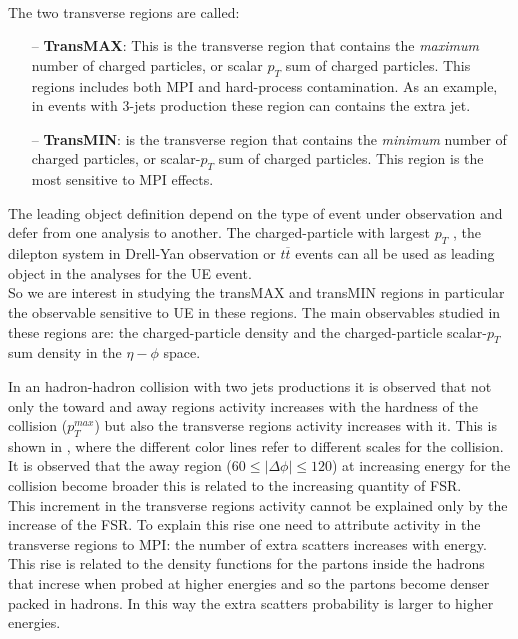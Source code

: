 \\
The two transverse regions are called:
\begin{itemize}
	\item[--] \textbf{TransMAX}: This is the transverse region that contains the \textit{maximum} number of charged particles, or scalar $p_T$ sum of charged particles. This regions includes both MPI and hard-process contamination.
As an example, in events with 3-jets production these region can contains the extra jet.	
	\item[--] \textbf{TransMIN}: is the transverse region that contains the \textit{minimum} number of charged particles, or scalar-$p_T$ sum of charged particles. This region is the most  sensitive to MPI effects.
\end{itemize}

\noindent The leading object definition depend on the type of event under observation and defer from one analysis to another. 
The charged-particle with largest $p_T$ \cite{CMS-PAS-FSQ-15-007}, the dilepton system in Drell-Yan observation \cite{CMS:2012oqb, CMS:2017ngy} or $t\overline{t}$ events \cite{CMS:2018mdd} can all be used as leading object in the analyses for the UE event.
\\
So we are interest in studying the transMAX and transMIN regions in particular the observable sensitive to UE in these regions. The main observables studied in these regions are: the charged-particle density and the charged-particle scalar-$p_T$ sum density in the $\eta-\phi$ space.

In an hadron-hadron collision with two jets productions it is observed that not only the toward and away regions activity increases with the hardness of the collision ($p_T^{max}$) but also the transverse regions activity increases with it. This is shown in , where the different color lines refer to different scales for the collision. It is observed that the away region ($60\leq |\Delta\phi|\leq 120$) at increasing energy for the collision become broader this is related to the increasing quantity of FSR.
\\
This increment in the transverse regions activity cannot be explained only by the increase of the FSR. To explain this rise one need to attribute activity in the transverse regions to MPI: the number of extra scatters increases with energy. This rise is related to the density functions for the partons inside the hadrons that increse when probed at higher energies and so the partons become denser packed in hadrons. In this way the extra scatters probability is larger to higher energies. 

